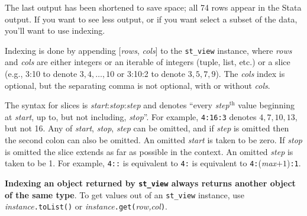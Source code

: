 \documentclass{article}
\begin{document}
\medskip

The last output has been shortened to save space; all 74 rows appear in the Stata output. If you want to see less output, or if you want select a subset of the data, you'll want to use indexing.

Indexing is done by appending [\textit{rows}, \textit{cols}] to the \lstinline{st_view} instance, where \textit{rows} and \textit{cols} are either integers or an iterable of integers (tuple, list, etc.) or a slice (e.g., 3:10 to denote $3, 4, \ldots, 10$ or 3:10:2 to denote $3, 5, 7, 9$). The \textit{cols} index is optional, but the separating comma is not optional, with or without \textit{cols}. 

The syntax for slices is \textit{start}:\textit{stop}:\textit{step} and denotes ``every \textit{step}$^{\text{th}}$ value beginning at \textit{start}, up to, but not including, \textit{stop}''. For example, \lstinline{4:16:3} denotes $4, 7, 10, 13$, but not 16. Any of \textit{start}, \textit{stop}, \textit{step} can be omitted, and if \textit{step} is omitted then the second colon can also be omitted. An omitted \textit{start} is taken to be zero. If \textit{stop} is omitted the slice extends as far as possible in the context. An omitted \textit{step} is taken to be 1. For example,
\lstinline{4::} is equivalent to \lstinline{4:} is equivalent to \lstinline{4:}(\textit{max}$ + 1$)\lstinline{:1}.

\textbf{Indexing an object returned by \lstinline{st_view} always returns another object of the same type}. To get values out of an \lstinline{st_view} instance, use \textit{instance}\lstinline{.toList()} or \textit{instance}\lstinline{.get(}\textit{row,col}\lstinline{)}.
\end{document}
